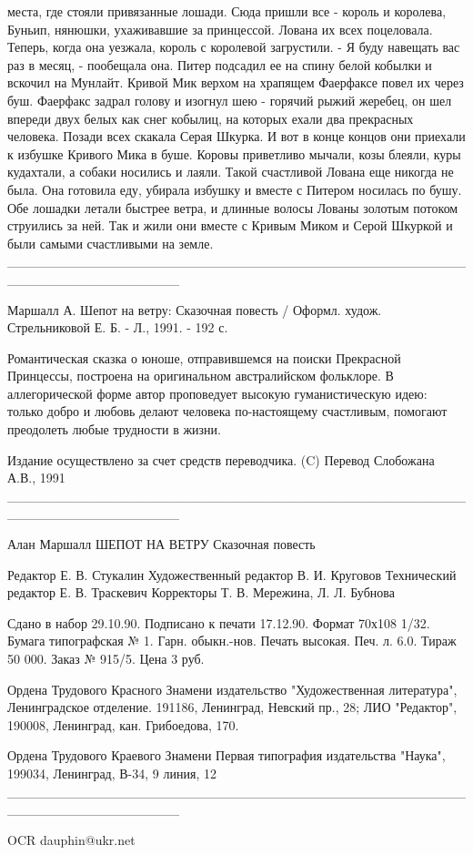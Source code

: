 места, где стояли привязанные лошади. Сюда пришли все - король и 
королева, Буньип, нянюшки, ухаживавшие за принцессой. Лована их всех 
поцеловала. Теперь, когда она уезжала, король с королевой загрустили.
    - Я буду навещать вас раз в месяц, - пообещала она.
    Питер подсадил ее на спину белой кобылки и вскочил на Мунлайт. 
Кривой Мик верхом на храпящем Фаерфаксе повел их через буш. Фаерфакс 
задрал голову и изогнул шею - горячий рыжий жеребец, он шел впереди 
двух белых как снег кобылиц, на которых ехали два прекрасных человека. 
Позади всех скакала Серая Шкурка.
    И вот в конце концов они приехали к избушке Кривого Мика в буше. 
Коровы приветливо мычали, козы блеяли, куры кудахтали, а собаки 
носились и лаяли. Такой счастливой Лована еще никогда не была.
    Она готовила еду, убирала избушку и вместе с Питером носилась по 
бушу. Обе лошадки летали быстрее ветра, и длинные волосы Лованы 
золотым потоком струились за ней.
    Так и жили они вместе с Кривым Миком и Серой Шкуркой и были самыми 
счастливыми на земле.
__________________________________________________________________

    Маршалл А. Шепот на ветру: Сказочная повесть / Оформл. худож. 
Стрельниковой Е. Б. - Л., 1991. - 192 с.

    Романтическая сказка о юноше, отправившемся на поиски Прекрасной 
Принцессы, построена на оригинальном австралийском фольклоре.
    В аллегорической форме автор проповедует высокую гуманистическую 
идею: только добро и любовь делают человека по-настоящему счастливым, 
помогают преодолеть любые трудности в жизни.

    Издание осуществлено за счет средств переводчика.
    (C) Перевод Слобожана А.В., 1991
__________________________________________________________________

    Алан Маршалл
    ШЕПОТ НА ВЕТРУ
    Сказочная повесть

    Редактор Е. В. Стукалин
    Художественный редактор В. И. Круговов
    Технический редактор Е. В. Траскевич
    Корректоры Т. В. Мережина, Л. Л. Бубнова

    Сдано в набор 29.10.90. Подписано к печати 17.12.90.
    Формат 70х108 1/32. Бумага типографская № 1.
    Гарн. обыкн.-нов. Печать высокая. Печ. л. 6.0.
    Тираж 50 000. Заказ № 915/5. Цена 3 руб.

    Ордена Трудового Красного Знамени издательство "Художественная 
литература", Ленинградское отделение. 191186, Ленинград, Невский пр., 
28; ЛИО "Редактор", 190008, Ленинград, кан. Грибоедова, 170.

    Ордена Трудового Краевого Знамени Первая типография издательства 
"Наука", 199034, Ленинград, В-34, 9 линия, 12
__________________________________________________________________

    OCR dauphin@ukr.net